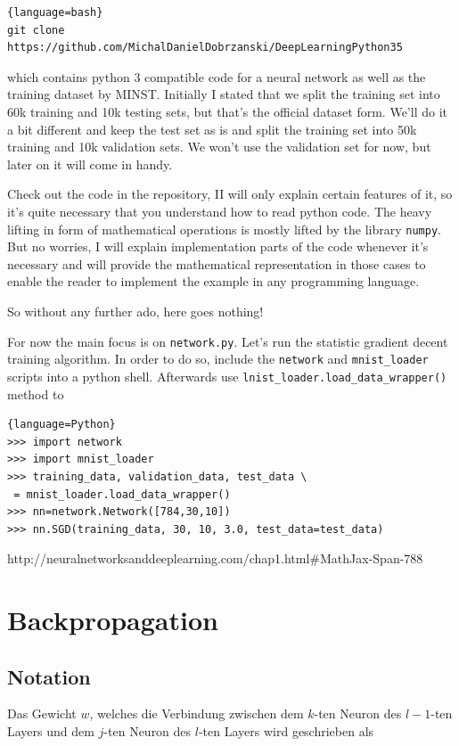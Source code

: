 \documentclass[10pt]{book}
\begin{document}
    \begin{lstlisting}[basicstyle=\tiny]{language=bash}
git clone https://github.com/MichalDanielDobrzanski/DeepLearningPython35
    \end{lstlisting}
    which contains python 3 compatible code for a neural network as well as the training dataset by MINST.
    Initially I stated that we split the training set into 60k training and 10k testing sets, but that's the official
    dataset form. We'll do it a bit different and keep the test set as is and split the training set into 50k training and 10k
    validation sets. We won't use the validation set for now, but later on it will come in handy.

    Check out the code in the repository, II will only explain certain features of it, so it's quite necessary that you understand how to read python code.
    The heavy lifting in form of mathematical operations is mostly lifted by the library \lstinline{numpy}. But no worries, I will explain implementation parts of the code whenever it's necessary and
    will provide the mathematical representation in those cases to enable the reader to implement the example in any programming language.

    So without any further ado, here goes nothing!

    For now the main focus is on \lstinline{network.py}. Let's run the statistic gradient decent training algorithm.
    In order to do so, include the \lstinline{network} and \lstinline{mnist_loader} scripts into  a python shell.
    Afterwards use \lstinline{lnist_loader.load_data_wrapper()} method to 
\begin{lstlisting}{language=Python}
>>> import network
>>> import mnist_loader
>>> training_data, validation_data, test_data \
 = mnist_loader.load_data_wrapper()
>>> nn=network.Network([784,30,10])
>>> nn.SGD(training_data, 30, 10, 3.0, test_data=test_data)
\end{lstlisting}
http://neuralnetworksanddeeplearning.com/chap1.html#MathJax-Span-788
    
    \section{Backpropagation}
    \subsection{Notation}

    Das Gewicht \(w\), welches die Verbindung zwischen dem \(k\)-ten Neuron des \(l-1\)-ten Layers und dem \(j\)-ten Neuron des \(l\)-ten Layers
    wird geschrieben als
\end{document}
